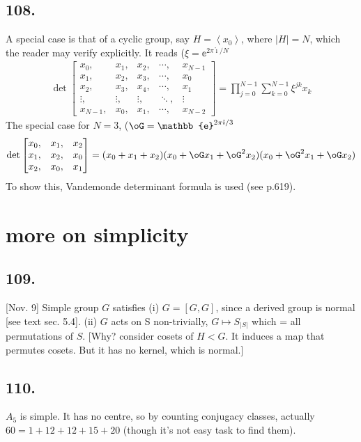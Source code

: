 \documentclass[12pt]{article}
\newcommand\Mp\mapsto%
\newcommand{\ii}{ \mathring{\imath} }%
\newcommand{\ee}{ \BF{e} }%
\newcommand{\Ab}[1]{ \left\langle #1 \right\rangle } %
\newcommand{\BF}[1]{ \mathbb{#1} }%
\begin{document}
\subsection*{108.} A special case is that of a cyclic group, say \(H = \Ab{x_0}\), where \(|H|=N\), which the reader may verify explicitly. It reads (\(\xi = \ee^{2\pi \ii/N}\) \begin{gather*}
 \det \begin{bmatrix}
  x_0, &x_1, &x_2, &\cdots, &x_{N-1} \\
  x_1, &x_2, &x_3, &\cdots, &x_0 \\
  x_2, &x_3, &x_4, &\cdots, &x_1 \\
  \vdots, &\vdots, &\vdots, &\ddots, &\vdots \\
  x_{N-1}, &x_0, &x_1, &\cdots, &x_{N-2}
 \end{bmatrix}
 = \prod_{j=0}^{N-1} \sum_{k=0}^{N-1} \xi^{jk} x_k
\end{gather*} The special case for \(N=3\), (\(\oG = \ee^{2\pi \ii/3}\) \begin{gather*}
 \det \begin{bmatrix}
  x_0, &x_1, &x_2 \\
  x_1, &x_2, &x_0 \\
  x_2, &x_0, &x_1
 \end{bmatrix}
 = (x_0 +x_1 +x_2) (x_0 +\oG x_1 +\oG^2 x_2) (x_0 +\oG^2 x_1 +\oG x_2)
\end{gather*} To show this, Vandemonde determinant formula is used (see p.619). 

\section{more on simplicity}
\subsection*{109.} [Nov. 9] Simple group \(G\) satisfies (i) \(G = [G,G]\), since a derived group is normal [see text sec. 5.4]. 
(ii) \(G\) acts on S non-trivially, \(G \Mp S_{|S|}\) which = all permutations of \(S\). 
[Why? consider cosets of \(H < G\). It induces a map that permutes cosets. But it has no kernel, which is normal.]

\subsection*{110.} \(A_5\) is simple. It has no centre, so by counting conjugacy classes, actually \(60 = 1 + 12 + 12 + 15 + 20\) (though it's not easy task to find them). 
\end{document}
